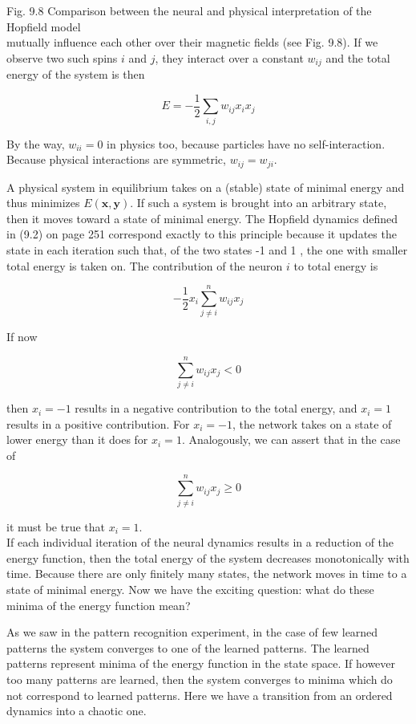 \documentclass[10pt]{article}
\begin{document}
Fig. 9.8 Comparison between the neural and physical interpretation of the Hopfield model\\
mutually influence each other over their magnetic fields (see Fig. 9.8). If we observe two such spins $i$ and $j$, they interact over a constant $w_{i j}$ and the total energy of the system is then


$$
E=-\frac{1}{2} \sum_{i, j} w_{i j} x_{i} x_{j}
$$

By the way, $w_{i i}=0$ in physics too, because particles have no self-interaction. Because physical interactions are symmetric, $w_{i j}=w_{j i}$.

A physical system in equilibrium takes on a (stable) state of minimal energy and thus minimizes $E(\boldsymbol{x}, \boldsymbol{y})$. If such a system is brought into an arbitrary state, then it moves toward a state of minimal energy. The Hopfield dynamics defined in (9.2) on page 251 correspond exactly to this principle because it updates the state in each iteration such that, of the two states -1 and 1 , the one with smaller total energy is taken on. The contribution of the neuron $i$ to total energy is

$$
-\frac{1}{2} x_{i} \sum_{j \neq i}^{n} w_{i j} x_{j}
$$

If now

$$
\sum_{j \neq i}^{n} w_{i j} x_{j}<0
$$

then $x_{i}=-1$ results in a negative contribution to the total energy, and $x_{i}=1$ results in a positive contribution. For $x_{i}=-1$, the network takes on a state of lower energy than it does for $x_{i}=1$. Analogously, we can assert that in the case of

$$
\sum_{j \neq i}^{n} w_{i j} x_{j} \geq 0
$$

it must be true that $x_{i}=1$.\\
If each individual iteration of the neural dynamics results in a reduction of the energy function, then the total energy of the system decreases monotonically with time. Because there are only finitely many states, the network moves in time to a state of minimal energy. Now we have the exciting question: what do these minima of the energy function mean?

As we saw in the pattern recognition experiment, in the case of few learned patterns the system converges to one of the learned patterns. The learned patterns represent minima of the energy function in the state space. If however too many patterns are learned, then the system converges to minima which do not correspond to learned patterns. Here we have a transition from an ordered dynamics into a chaotic one.
\end{document}
